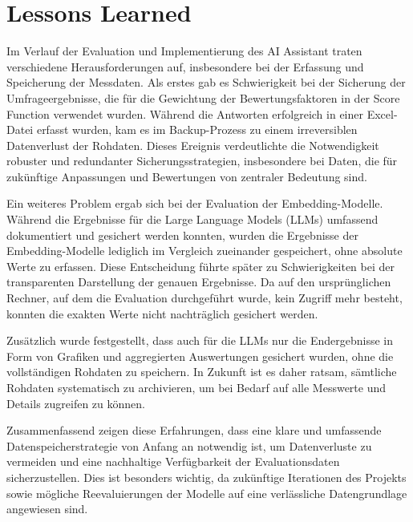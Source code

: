 \section{Lessons Learned}

Im Verlauf der Evaluation und Implementierung des AI Assistant traten verschiedene Herausforderungen auf, insbesondere bei der Erfassung und Speicherung der Messdaten. 
Als erstes gab es Schwierigkeit bei der Sicherung der Umfrageergebnisse, die für die Gewichtung der Bewertungsfaktoren in der Score Function verwendet wurden. 
Während die Antworten erfolgreich in einer Excel-Datei erfasst wurden, kam es im Backup-Prozess zu einem irreversiblen Datenverlust der Rohdaten. 
Dieses Ereignis verdeutlichte die Notwendigkeit robuster und redundanter Sicherungsstrategien, insbesondere bei Daten, die für zukünftige Anpassungen und Bewertungen von zentraler Bedeutung sind.

Ein weiteres Problem ergab sich bei der Evaluation der Embedding-Modelle. Während die Ergebnisse für die Large Language Models (LLMs) umfassend dokumentiert und gesichert werden konnten, 
wurden die Ergebnisse der Embedding-Modelle lediglich im Vergleich zueinander gespeichert, ohne absolute Werte zu erfassen. 
Diese Entscheidung führte später zu Schwierigkeiten bei der transparenten Darstellung der genauen Ergebnisse. 
Da auf den ursprünglichen Rechner, auf dem die Evaluation durchgeführt wurde, kein Zugriff mehr besteht, konnten die exakten Werte nicht nachträglich gesichert werden.

Zusätzlich wurde festgestellt, dass auch für die LLMs nur die Endergebnisse in Form von Grafiken und aggregierten Auswertungen gesichert wurden, ohne die vollständigen Rohdaten zu speichern. 
In Zukunft ist es daher ratsam, sämtliche Rohdaten systematisch zu archivieren, um bei Bedarf auf alle Messwerte und Details zugreifen zu können.

Zusammenfassend zeigen diese Erfahrungen, dass eine klare und umfassende Datenspeicherstrategie von Anfang an notwendig ist, um Datenverluste zu vermeiden und eine nachhaltige Verfügbarkeit der Evaluationsdaten sicherzustellen. 
Dies ist besonders wichtig, da zukünftige Iterationen des Projekts sowie mögliche Reevaluierungen der Modelle auf eine verlässliche Datengrundlage angewiesen sind.